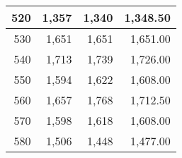 \begin{longtable}{|r|r|r|r|}
		520                                                                                                                   & 1,357                                                & 1,340                                                & 1,348.50                                                                                                               \\ \hline
		530                                                                                                                   & 1,651                                                & 1,651                                                & 1,651.00                                                                                                               \\ \hline
		540                                                                                                                   & 1,713                                                & 1,739                                                & 1,726.00                                                                                                               \\ \hline
		550                                                                                                                   & 1,594                                                & 1,622                                                & 1,608.00                                                                                                               \\ \hline
		560                                                                                                                   & 1,657                                                & 1,768                                                & 1,712.50                                                                                                               \\ \hline
		570                                                                                                                   & 1,598                                                & 1,618                                                & 1,608.00                                                                                                               \\ \hline
		580                                                                                                                   & 1,506                                                & 1,448                                                & 1,477.00                                                                                                               \\ \hline

\end{longtable}
